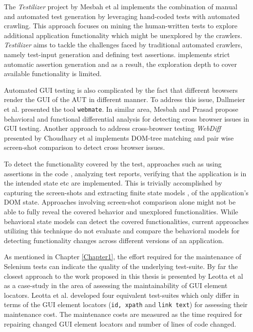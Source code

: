 The \textit{Testilizer} project by Mesbah et al \cite{testilizer} implements the combination of manual and automated test generation by leveraging hand-coded tests with automated crawling. This approach focuses on mining the human-written tests to explore additional application functionality which might be unexplored by the crawlers. \textit{Testilizer} aims to tackle the challenges faced by traditional automated crawlers, namely test-input generation and defining test assertions. implements strict automatic assertion generation and as a result, the exploration depth to cover available functionality is limited.

Automated GUI testing is also complicated by the fact that different browsers render the GUI of the AUT in different manner. To address this issue, Dallmeier et al. presented the tool \texttt{webmate}. In similar area, Mesbah and Prasad\cite{CBCMesbah} propose behavioral and functional differential analysis for detecting cross browser issues in GUI testing. Another approach to address cross-browser testing \textit{WebDiff} presented by Choudhary et al \cite{WebDiff} implements DOM-tree matching and pair wise screen-shot comparison to detect cross browser issues. 

To detect the functionality covered by the test, approaches such as using assertions in the code \cite{voas1997assertions}, analyzing test reports, verifying that the application is in the intended state etc are implemented. This is trivially accomplished by capturing the screen-shots \cite{GUIdiffBauersfeld} and extracting finite state models \cite{marchettoStateBased}, \cite{SchurMiningBehavModels} of the application's DOM state. Approaches involving screen-shot comparison alone might not be able to fully reveal the covered behavior and unexplored functionalities. While behavioral state models can detect the covered functionalities, current approaches utilizing this technique do not evaluate and compare the behavioral models for detecting functionality changes across different versions of an application. 

As mentioned in Chapter \ref{Chapter1}, the effort required for the maintenance of Selenium tests can indicate the quality of the underlying test-suite. By far the closest approach to the work proposed in this thesis is presented by Leotta et al \cite{leotta2013comparing} as a case-study in the area of assessing the maintainability of GUI element locators. Leotta et al. developed four equivalent test-suites which only differ in terms of the GUI element locators (\texttt{id, xpath} and \texttt{link text}) for assessing their maintenance cost. The maintenance costs are measured as the time required for repairing changed GUI element locators and number of lines of code changed. 

